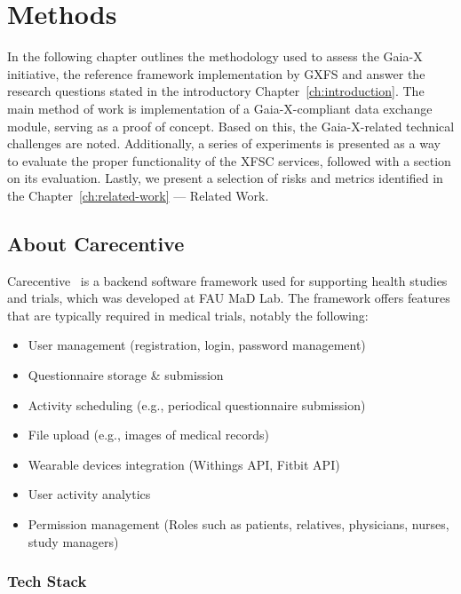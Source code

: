 \chapter{Methods}\label{ch:methods}

\begin{chapterabstract}
    In the following chapter outlines the methodology used to assess the Gaia-X initiative, the reference framework implementation by GXFS and answer the research questions stated in the introductory Chapter~\ref{ch:introduction}.%
    The main method of work is implementation of a Gaia-X-compliant data exchange module, serving as a proof of concept.
    Based on this, the Gaia-X-related technical challenges are noted.
    Additionally, a series of experiments is presented as a way to evaluate the proper functionality of the XFSC services, followed with a section on its evaluation.
    Lastly, we present a selection of risks and metrics identified in the Chapter~\ref{ch:related-work} --- Related Work.
\end{chapterabstract}

\section{About Carecentive}\label{sec:about-carecentive}

Carecentive~\cite{carecentive} is a backend software framework used for supporting health studies and trials, which was developed at FAU MaD Lab.
The framework offers features that are typically required in medical trials, notably the following:
\begin{itemize}
    \item User management (registration, login, password management)
    \item Questionnaire storage \& submission
    \item Activity scheduling (e.g., periodical questionnaire submission)
    \item File upload (e.g., images of medical records)
    \item Wearable devices integration (Withings API, Fitbit API)
    \item User activity analytics
    \item Permission management (Roles such as patients, relatives, physicians, nurses, study managers)
\end{itemize}

\subsection{Tech Stack}\label{subsec:tech-stack}

